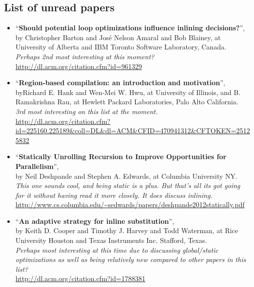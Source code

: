\subsection{List of unread papers}

\begin{itemize}

	\item ``\textbf{Should potential loop optimizations influence inlining
decisions?}'', by Christopher Barton and José Nelson Amaral and Bob Blainey, at
University of Alberta and IBM Toronto Software Laboratory, Canada. \\
\textit{Perhaps 2nd most interesting at this moment?}\\
\url{http://dl.acm.org/citation.cfm?id=961329}

	\item ``\textbf{Region-based compilation: an introduction and motivation}'',
\\ byRichard E. Hank and Wen-Mei W. Hwu, at University of Illinois, and B.
Ramakrishna Rau, at Hewlett Packard Laboratories, Palo Alto California. \\
\textit{3rd most interesting on this list at the moment.} \\
\url{http://dl.acm.org/citation.cfm?id=225160.225189&coll=DL&dl=ACM&CFID=470941312&CFTOKEN=25125832}

	\item ``\textbf{Statically Unrolling Recursion to Improve Opportunities for
Parallelism}'', \\by Neil Deshpande and Stephen A. Edwards, at Columbia
University NY. \\
\textit{This one sounds cool, and being static is a plus. But that's all its got
going for it without having read it more closely. It does discuss inlining.}\\
\url{http://www.cs.columbia.edu/~sedwards/papers/deshpande2012statically.pdf}

	\item ``\textbf{An adaptive strategy for inline substitution}'', \\ by Keith
D. Cooper and Timothy J. Harvey and Todd Waterman, at Rice University Houston
and Texas Instruments Inc. Stafford, Texas. \\
\textit{Perhaps most interesting at this time due to discussing global/static
optimizations as well as being relatively new compared to other papers in this
list?}\\
\url{http://dl.acm.org/citation.cfm?id=1788381}


\end{itemize}
